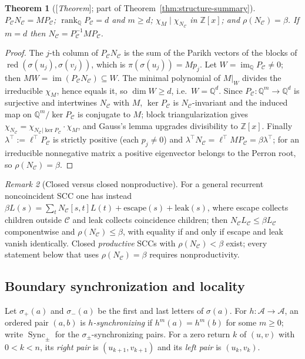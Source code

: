 \documentclass[11pt]{amsart}
\theoremstyle{plain}
\newtheorem{theorem}{Theorem}[section]
\theoremstyle{definition}
\theoremstyle{remark}
\newtheorem{remark}[theorem]{Remark}
\newcommand{\Z}{\mathbb{Z}}
\newcommand{\Q}{\mathbb{Q}}
\newcommand{\A}{\mathcal{A}}
\newcommand{\cC}{\mathcal{C}}
\newcommand{\rank}{\operatorname{rank}}
\newcommand{\Sync}{\operatorname{Sync}}
\newcommand{\red}{\operatorname{red}}
\newcommand{\Status}[1]{\textup{[\textit{#1}]}}
\begin{document}
\begin{theorem}[\Status{Theorem}; part of Theorem~\ref{thm:structure-summary}]\label{thm:parikh}
$P_\cC N_\cC=M P_\cC$; $\rank_\Q P_\cC=d$ and $m\ge d$; $\chi_M\mid\chi_{N_\cC}$ in $\Z[x]$; and $\rho(N_\cC)=\beta$. If $m=d$ then $N_\cC=P_\cC^{-1}MP_\cC$.
\end{theorem}
\begin{proof}
The $j$-th column of $P_\cC N_\cC$ is the sum of the Parikh vectors of the blocks of $\red(\sigma(u_j),\sigma(v_j))$, which is $\pi(\sigma(u_j))=Mp_j$. Let $W=\operatorname{im}_\Q P_\cC\ne0$; then $MW=\operatorname{im}(P_\cC N_\cC)\subseteq W$. The minimal polynomial of $M|_W$ divides the irreducible $\chi_M$, hence equals it, so $\dim W\ge d$, i.e.\ $W=\Q^d$. Since $P_\cC:\Q^m\to\Q^d$ is surjective and intertwines $N_\cC$ with $M$, $\ker P_\cC$ is $N_\cC$-invariant and the induced map on $\Q^m/\ker P_\cC$ is conjugate to $M$; block triangularization gives $\chi_{N_\cC}=\chi_{N_\cC|\ker P_\cC}\cdot\chi_M$, and Gauss's lemma upgrades divisibility to $\Z[x]$. Finally $\lambda^\top:=\ell^\top P_\cC$ is strictly positive (each $p_j\ne0$) and $\lambda^\top N_\cC=\ell^\top MP_\cC=\beta\lambda^\top$; for an irreducible nonnegative matrix a positive eigenvector belongs to the Perron root, so $\rho(N_\cC)=\beta$.
\end{proof}

\begin{remark}[Closed versus closed nonproductive]
For a general recurrent noncoincident SCC one has instead $\beta L(s)=\sum_tN_\cC[s,t]L(t)+\text{escape}(s)+\text{leak}(s)$, where escape collects children outside $\cC$ and leak collects coincidence children; then $N_\cC L_\cC\le\beta L_\cC$ componentwise and $\rho(N_\cC)\le\beta$, with equality if and only if escape and leak vanish identically. Closed \emph{productive} SCCs with $\rho(N_\cC)<\beta$ exist; every statement below that uses $\rho(N_\cC)=\beta$ requires nonproductivity.
\end{remark}

\subsection{Boundary synchronization and locality}\label{sec:boundary}

Let $\sigma_+(a)$ and $\sigma_-(a)$ be the first and last letters of $\sigma(a)$. For $h:\A\to\A$, an ordered pair $(a,b)$ is \emph{$h$-synchronizing} if $h^m(a)=h^m(b)$ for some $m\ge0$; write $\Sync_\pm$ for the $\sigma_\pm$-synchronizing pairs. For a zero return $k$ of $(u,v)$ with $0<k<n$, its \emph{right pair} is $(u_{k+1},v_{k+1})$ and its \emph{left pair} is $(u_k,v_k)$.
\end{document}
